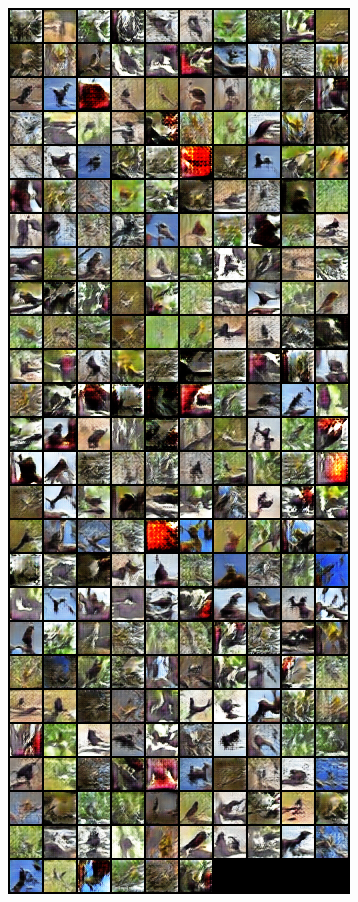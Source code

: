 \documentclass[11pt,addpoints,answers]{exam}
\numberwithin{equation}{section} %
\numberwithin{figure}{section} %
\numberwithin{table}{section} %
\begin{document}
\begin{questions}
\begin{figure}[H]
\begin{subfigure}[b]{0.32\linewidth}
        \includegraphics[width=\linewidth]{1.4_samples.png}

\end{subfigure}
\end{figure}
\end{questions}
\end{document}
